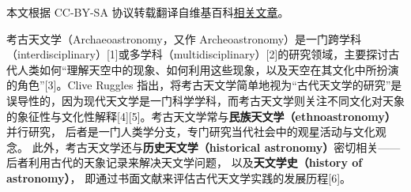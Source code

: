
本文根据 CC-BY-SA 协议转载翻译自维基百科\href{https://en.wikipedia.org/wiki/Archaeoastronomy}{相关文章}。


考古天文学（Archaeoastronomy，又作 Archeoastronomy）是一门跨学科（interdisciplinary）[1]或多学科（multidisciplinary）[2]的研究领域，主要探讨古代人类如何“理解天空中的现象、如何利用这些现象，以及天空在其文化中所扮演的角色”[3]。Clive Ruggles 指出，将考古天文学简单地视为“古代天文学的研究”是误导性的，因为现代天文学是一门科学学科，而考古天文学则关注不同文化对天象的象征性与文化性解释[4][5]。考古天文学常与\textbf{民族天文学（ethnoastronomy）}并行研究，  
后者是一门人类学分支，专门研究当代社会中的观星活动与文化观念。  
此外，考古天文学还与\textbf{历史天文学（historical astronomy）}密切相关——  
后者利用古代的天象记录来解决天文学问题，  
以及\textbf{天文学史（history of astronomy）}，  
即通过书面文献来评估古代天文学实践的发展历程[6]。
